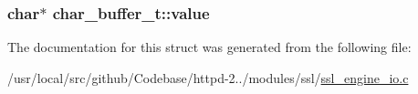 \subsubsection[{\texorpdfstring{value}{value}}]{\setlength{\rightskip}{0pt plus 5cm}char$\ast$ char\+\_\+buffer\+\_\+t\+::value}\hypertarget{structchar__buffer__t_a93e7d3dbeb19740dcbae31b1c2acfc8c}{}\label{structchar__buffer__t_a93e7d3dbeb19740dcbae31b1c2acfc8c}


The documentation for this struct was generated from the following file\+:\begin{DoxyCompactItemize}
\item 
/usr/local/src/github/\+Codebase/httpd-\/2../modules/ssl/\hyperlink{ssl__engine__io_8c}{ssl\+\_\+engine\+\_\+io.\+c}\end{DoxyCompactItemize}
